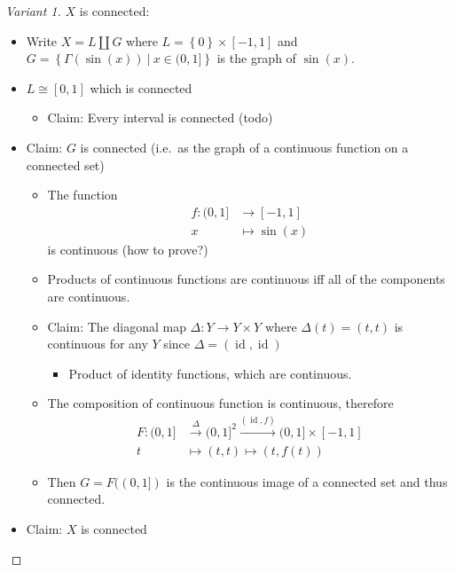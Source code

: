 \begin{solution}

\envlist

\begin{concept}


\envlist

\end{concept}

\begin{proof}[Variant 1]

\(X\) is connected:

\begin{itemize}
\tightlist
\item
  Write \(X = L{\coprod}G\) where
  \(L = \left\{{0}\right\} \times[-1, 1]\) and
  \(G = \left\{{\Gamma(\sin(x)) {~\mathrel{\Big|}~}x\in (0, 1]}\right\}\)
  is the graph of \(\sin(x)\).
\item
  \(L \cong [0, 1]\) which is connected

  \begin{itemize}
  \tightlist
  \item
    Claim: Every interval is connected (todo)
  \end{itemize}
\item
  Claim: \(G\) is connected (i.e.~as the graph of a continuous function
  on a connected set)

  \begin{itemize}
  \tightlist
  \item
    The function
    \begin{align*}     f: (0, 1] &\to [-1, 1] \\     x &\mapsto \sin(x)     \end{align*}
    is continuous (how to prove?)
  \item
    Products of continuous functions are continuous iff all of the
    components are continuous.
  \item
    Claim: The diagonal map \(\Delta: Y\to Y\times Y\) where
    \(\Delta(t) = (t, t)\) is continuous for any \(Y\) since
    \(\Delta = (\operatorname{id}, \operatorname{id})\)

    \begin{itemize}
    \tightlist
    \item
      Product of identity functions, which are continuous.
    \end{itemize}
  \item
    The composition of continuous function is continuous, therefore
    \begin{align*}     F : (0, 1] &\xrightarrow{\Delta} (0, 1]^2 \xrightarrow{(\operatorname{id}, f)} (0, 1] \times[-1, 1]  \\     t &\mapsto (t, t) \mapsto (t, f(t))     \end{align*}
  \item
    Then \(G = F((0, 1])\) is the continuous image of a connected set
    and thus connected.
  \end{itemize}
\item
  Claim: \(X\) is connected


\end{itemize}
\end{proof}
\end{solution}
